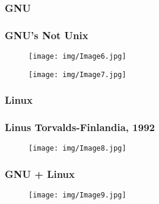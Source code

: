 \documentclass{beamer}
\begin{document}
\AtBeginSubsubsection[]
{
  \begin{frame}
    \tableofcontents[sectionstyle=show/shaded,subsectionstyle=show/shaded/hide,subsubsectionstyle=show/shaded/hide]
  \end{frame}
}
\subsubsection{GNU}
\begin{frame}
  \frametitle{GNU's Not Unix}
  \begin{figure}[H]
    \centering
    \texttt{[image: img/Image6.jpg]}
  \end{figure}
\end{frame}

\begin{frame}
  \begin{figure}[H]
    \centering
    \texttt{[image: img/Image7.jpg]}
  \end{figure}
\end{frame}


\AtBeginSubsubsection[]
{
  \begin{frame}
    \tableofcontents[sectionstyle=show/shaded,subsectionstyle=show/shaded/hide,subsubsectionstyle=show/shaded/hide]
  \end{frame}
}
\subsubsection{Linux}
\begin{frame}
  \frametitle{Linus Torvalds-Finlandia, 1992}
  \begin{figure}[H]
    \centering
    \texttt{[image: img/Image8.jpg]}
  \end{figure}
\end{frame}

 \begin{frame}
  \frametitle{GNU + Linux}
  \begin{figure}[H]
    \centering
    \texttt{[image: img/Image9.jpg]}
  \end{figure}
\end{frame}
\end{document}

